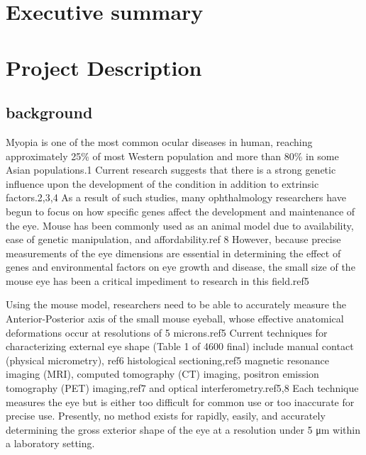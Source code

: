 \documentclass{article}
\begin{document}

\setcounter{tocdepth}{3}
\tableofcontents
\newpage

\section*{Executive summary}
\label{sec:exec-summary}

\newpage

\section{Project Description}
\label{sec:project-description}

\subsection{background}
\label{sec:background}
Myopia is one of the most common ocular diseases in human, reaching approximately 25\% of most Western population and more than 80\% in some Asian populations.\cite{rajan98}1 Current research suggests that there is a strong genetic influence upon the development of the condition in addition to extrinsic factors.\cite{zhou99:genes,zhou99:models,schmucker04}2,3,4 As a result of such studies, many ophthalmology researchers have begun to focus on how specific genes affect the development and maintenance of the eye. Mouse has been commonly used as an animal model due to availability, ease of genetic manipulation, and affordability.\cite{schaeffel04}ref 8  However, because precise measurements of the eye dimensions are essential in determining the effect of genes and environmental factors on eye growth and disease, the small size of the mouse eye has been a critical impediment to research in this field.\cite{schaeffel04}ref5 
 
Using the mouse model, researchers need to be able to accurately measure the Anterior-Posterior axis of the small mouse eyeball, whose effective anatomical deformations occur at resolutions of 5 microns.\cite{schaeffel04}ref5  Current techniques for characterizing external eye shape (Table 1 of 4600 final) include manual contact (physical micrometry),\cite{wallman04} ref6 histological sectioning,\cite{schaeffel04}ref5 magnetic resonance imaging (MRI), computed tomography (CT) imaging, positron emission tomography (PET) imaging,\cite{atchison04}ref7 and optical interferometry.\cite{schaeffel04,guggenheim04}ref5,8 Each technique measures the eye but is either too difficult for common use or too inaccurate for precise use. Presently, no method exists for rapidly, easily, and accurately determining the gross exterior shape of the eye at a resolution under 5 μm within a laboratory setting. 
\end{document}
